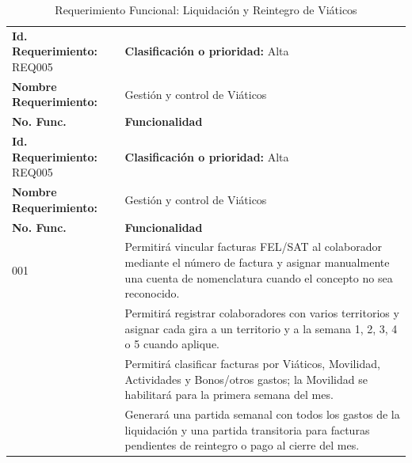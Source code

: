 {
\small
{}
\setlength{\parindent}{0pt}
\begin{xltabular}{\linewidth}{
    >{\raggedright\arraybackslash}p{4.2cm} 
    >{\raggedright\arraybackslash}X
}

    \caption{Requerimiento Funcional: Liquidación y Reintegro de Viáticos} \label{tab:req005_viaticos} \\
    \toprule
    \textbf{Id. Requerimiento:} REQ005 & \textbf{Clasificación o prioridad:} Alta \\
    \textbf{Nombre Requerimiento:} & Gestión y control de Viáticos \\
    \textbf{No. Func.} & \textbf{Funcionalidad} \\
    \midrule
    \endfirsthead

    \toprule
    \textbf{Id. Requerimiento:} REQ005 & \textbf{Clasificación o prioridad:} Alta \\
    \textbf{Nombre Requerimiento:} & Gestión y control de Viáticos \\
    \textbf{No. Func.} & \textbf{Funcionalidad} \\
    \midrule
    \endhead

    \endfoot

    \bottomrule
\endlastfoot

    001 & Permitirá vincular facturas FEL/SAT al colaborador mediante el número de factura y asignar manualmente una cuenta de nomenclatura cuando el concepto no sea reconocido. \\
     & Permitirá registrar colaboradores con varios territorios y asignar cada gira a un territorio y a la semana 1, 2, 3, 4 o 5 cuando aplique. \\
     & Permitirá clasificar facturas por Viáticos, Movilidad, Actividades y Bonos/otros gastos; la Movilidad se habilitará para la primera semana del mes. \\
     & Generará una partida semanal con todos los gastos de la liquidación y una partida transitoria para facturas pendientes de reintegro o pago al cierre del mes. \\
\end{xltabular}
}

